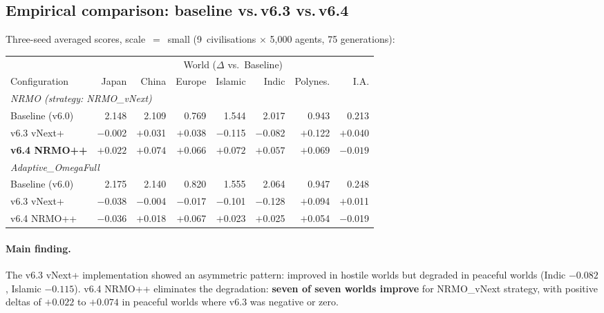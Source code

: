 \subsection{Empirical comparison: baseline vs.\,v6.3 vs.\,v6.4}
\label{sec:v64-empirical}

Three-seed averaged scores, scale~$=$~small (9~civilisations $\times$
5{,}000 agents, 75 generations):

\begin{center}
\small
\begin{tabular}{lrrrrrrr}
\toprule
\multicolumn{1}{l}{} & \multicolumn{7}{c}{World ($\Delta$ vs.~Baseline)} \\
\cmidrule(lr){2-8}
Configuration & Japan & China & Europe & Islamic & Indic & Polynes. & I.A. \\
\midrule
\multicolumn{8}{l}{\itshape NRMO (strategy: NRMO\_vNext)} \\
\quad Baseline (v6.0) & 2.148 & 2.109 & 0.769 & 1.544 & 2.017 & 0.943 & 0.213 \\
\quad v6.3 vNext+     & $-$0.002 & $+$0.031 & $+$0.038 & $-$0.115 & $-$0.082 & $+$0.122 & $+$0.040 \\
\quad \textbf{v6.4 NRMO++} & $\mathbf{+0.022}$ & $\mathbf{+0.074}$ & $\mathbf{+0.066}$ & $\mathbf{+0.072}$ & $\mathbf{+0.057}$ & $\mathbf{+0.069}$ & $-0.019$ \\
\midrule
\multicolumn{8}{l}{\itshape Adaptive\_OmegaFull} \\
\quad Baseline (v6.0) & 2.175 & 2.140 & 0.820 & 1.555 & 2.064 & 0.947 & 0.248 \\
\quad v6.3 vNext+     & $-$0.038 & $-$0.004 & $-$0.017 & $-$0.101 & $-$0.128 & $+$0.094 & $+$0.011 \\
\quad v6.4 NRMO++     & $-$0.036 & $+$0.018 & $+$0.067 & $+$0.023 & $+$0.025 & $+$0.054 & $-$0.019 \\
\bottomrule
\end{tabular}
\end{center}

\paragraph{Main finding.}
The v6.3 vNext+ implementation showed an asymmetric pattern: improved
in hostile worlds but degraded in peaceful worlds (Indic $-0.082$,
Islamic $-0.115$). v6.4 NRMO++ eliminates the degradation:
\textbf{seven of seven worlds improve} for NRMO\_vNext strategy, with
positive deltas of $+0.022$ to $+0.074$ in peaceful worlds where v6.3
was negative or zero.

